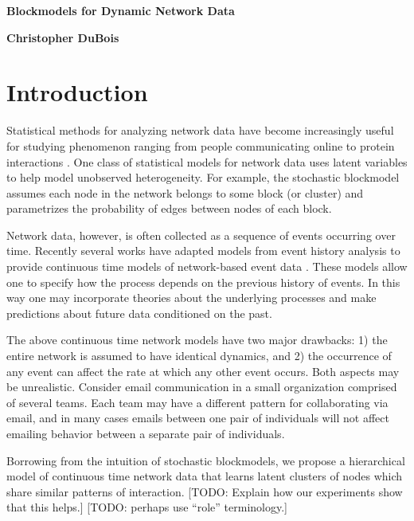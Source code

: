 \documentclass[11pt]{article}
\begin{document}
 

 \centerline{\Large \bf Blockmodels for Dynamic Network Data} 
 \medskip
\centerline{\bf Christopher DuBois}
 \bigskip

\section{Introduction}

Statistical methods for analyzing network data have become increasingly useful for studying  phenomenon ranging from people communicating online to protein interactions \cite{Goldenberg2009}. One class of statistical models for network data uses latent variables to help model unobserved heterogeneity.  For example, the stochastic blockmodel \cite{Nowicki2001, Kemp} assumes each node in the network belongs to some block (or cluster) and parametrizes the probability of edges between nodes of each block.  %

Network data, however, is often collected as a sequence of events occurring over time.   Recently several works have adapted models from event history analysis \cite{} to provide continuous time models of network-based event data \cite{Butts2008,Brandes2009,Perry2011,Stadtfeld2010,Stadtfeld2011,Opsahl2011,Vu2011,Vu2011a}.  These models allow one to specify how the process depends on the previous history of events.  In this way one may incorporate theories about the underlying processes and make predictions about future data conditioned on the past.

The above continuous time network models have two major drawbacks: 1) the entire network is assumed to have identical dynamics, and 2) the occurrence of any event can affect the rate at which any other event occurs.  Both aspects may be unrealistic.  Consider email communication in a small organization comprised of several teams.  Each team may have a different pattern for collaborating via email, and in many cases emails between one pair of individuals will not affect emailing behavior between a separate pair of individuals.

Borrowing from the intuition of stochastic blockmodels, we propose a hierarchical model of continuous time network data that learns latent clusters of nodes which share similar patterns of interaction.  [TODO: Explain how our experiments show that this helps.]   [TODO: perhaps use ``role'' terminology.] 
  
\end{document}
